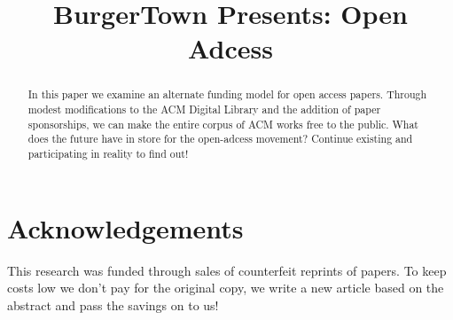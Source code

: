 \documentclass[sigtbd]{sigtbd17-style}
\begin{document}
\title{BurgerTown Presents: Open Adcess}
\maketitle

\begin{abstract}
  In this paper we examine an alternate funding model for open access papers.
  Through modest modifications to the ACM Digital Library and the addition of
  paper sponsorships, we can make the entire corpus of ACM works free to the
  public. What does the future have in store for the open-adcess movement?
  Continue existing and participating in reality to find out!
\end{abstract}













\section*{Acknowledgements}
This research was funded through sales of counterfeit reprints of papers.
To keep costs low we don't pay for the original copy, we write a new article
based on the abstract and pass the savings on to us!

{}

\end{document}

